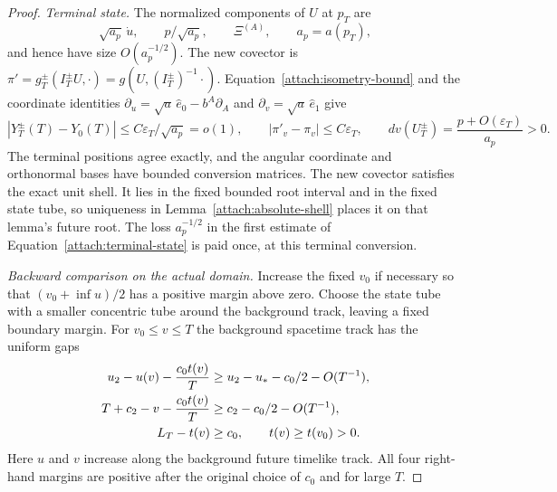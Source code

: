 \begin{proof}
\emph{Terminal state.}
The normalized components of $U$ at $p_T$ are
\[
 \sqrt{a_p}\,\dot u,\qquad p/\sqrt{a_p},\qquad \Xi^{(A)},
 \qquad a_p=a(p_T),
\]
and hence have size $O(a_p^{-1/2})$. The new covector is
$\pi'=g_T^\pm(I_T^\pm U,\cdot)
       =g(U,(I_T^\pm)^{-1}\cdot)$.
Equation~\eqref{attach:isometry-bound} and the coordinate identities
$\partial_u=\sqrt a\,\hat e_0-b^A\partial_A$ and
$\partial_v=\sqrt a\,\hat e_1$ give
\begin{equation}\label{attach:terminal-state}
 |Y_T^\pm(T)-Y_0(T)|
 \le C\varepsilon_T/\sqrt{a_p}=o(1),
 \qquad |\pi'_v-\pi_v|\le C\varepsilon_T,
 \qquad dv(U_T^\pm)=\frac{p+O(\varepsilon_T)}{a_p}>0.
\end{equation}
The terminal positions agree exactly, and the angular coordinate
and orthonormal bases have bounded conversion matrices. The new covector
satisfies the exact unit shell. It lies in the fixed bounded root
interval and in the fixed state tube, so uniqueness in
Lemma~\ref{attach:absolute-shell} places it on that lemma's future
root. The loss $a_p^{-1/2}$ in the first estimate of
Equation~\eqref{attach:terminal-state} is paid once, at this terminal
conversion.

\emph{Backward comparison on the actual domain.}
Increase the fixed $v_0$ if necessary so that
$(v_0+\inf u)/2$ has a positive margin above zero. Choose the state
tube with a smaller concentric tube around the background track,
leaving a fixed boundary margin. For $v_0\le v\le T$ the background
spacetime track has the uniform gaps
\begin{align}\label{attach:track-margins}
 u_2-u(v)-\frac{c_0t(v)}{T}
   &\ge u_2-u_* -c_0/2-O(T^{-1}),\notag\\
 T+c_2-v-\frac{c_0t(v)}{T}
   &\ge c_2-c_0/2-O(T^{-1}),\\
 L_T-t(v)&\ge c_0,
 \qquad t(v)\ge t(v_0)>0.\notag
\end{align}
Here $u$ and $v$ increase along the background future timelike
track. All four right-hand margins are positive after the original
choice of $c_0$ and for large $T$.


\end{proof}
